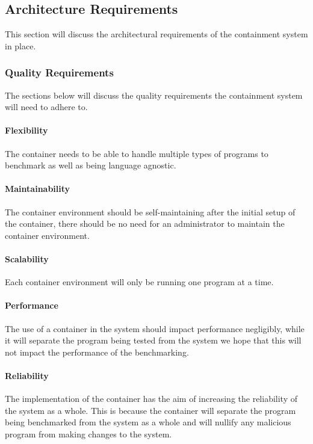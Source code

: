 
\subsection{Architecture Requirements}
This section will discuss the architectural requirements of the containment
system in place.

\subsubsection{Quality Requirements}
The sections below will discuss the quality requirements the containment 
system will need to adhere to.
\paragraph{Flexibility}
The container needs to be able to handle multiple types of programs to benchmark
as well as being language agnostic. 

\paragraph{Maintainability}
The container environment should be self-maintaining after the initial setup of
the container, there should be no need for an administrator to maintain the container
environment.

\paragraph{Scalability}
Each container environment will only be running one program at a time.

\paragraph{Performance}
The use of a container in the system should impact performance negligibly, while
it will separate the program being tested from the system we hope that this will
not impact the performance of the benchmarking.  


\paragraph{Reliability}
The implementation of the container has the aim of increasing the reliability of
the system as a whole. This is because the container will separate the program
being benchmarked from the system as a whole and will nullify any malicious 
program from making changes to the system.

